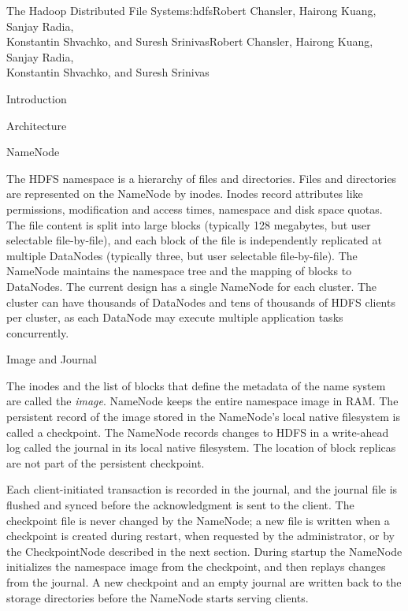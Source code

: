 \begin{aosachaptertoc}{The Hadoop Distributed File System}{s:hdfs}{Robert Chansler, Hairong Kuang, Sanjay Radia, \\ Konstantin Shvachko, and Suresh Srinivas}{Robert Chansler, Hairong Kuang, Sanjay Radia, \\ \hspace*{0.9cm} Konstantin Shvachko, and Suresh Srinivas}
\begin{aosasect1}{Introduction}
\end{aosasect1}

\begin{aosasect1}{Architecture}

\begin{aosasect2}{NameNode}

The HDFS namespace is a hierarchy of files and directories. Files and
directories are represented on the NameNode by inodes.  Inodes record
attributes like permissions, modification and access times, namespace
and disk space quotas. The file content is split into large blocks
(typically 128 megabytes, but user selectable file-by-file), and each
block of the file is independently replicated at multiple DataNodes
(typically three, but user selectable file-by-file). The NameNode
maintains the namespace tree and the mapping of blocks to DataNodes.
 The current design has a single
NameNode for each cluster. The cluster can have thousands of DataNodes
and tens of thousands of HDFS clients per cluster, as each DataNode
may execute multiple application tasks concurrently.

\end{aosasect2}

\begin{aosasect2}{Image and Journal}

The inodes and the list of blocks that define the metadata of the name
system are called the \emph{image}. NameNode keeps the entire namespace image
in RAM\@. The persistent record of the image stored in the NameNode's
local native filesystem is called a checkpoint. The NameNode records
changes to HDFS in a write-ahead log called the journal in
its local native filesystem. The location of block replicas are not
part of the persistent checkpoint.

Each client-initiated transaction is recorded in the journal, and the
journal file is flushed and synced before the acknowledgment is sent
to the client. The checkpoint file is never changed by the NameNode;
a new file is written when a checkpoint is created during
restart, when requested by the administrator, or by the CheckpointNode
described in the next section. During startup the NameNode initializes
the namespace image from the checkpoint, and then replays changes from
the journal. A new checkpoint and an empty journal are written back to
the storage directories before the NameNode starts serving clients.


\end{aosasect2}
\end{aosasect1}
\end{aosachaptertoc}
